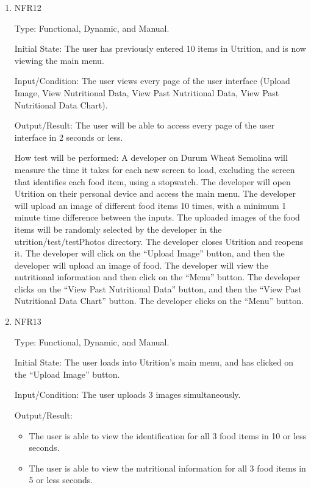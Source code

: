 \documentclass[12pt, titlepage]{article}
\begin{document}
\begin{enumerate}
	
\item{NFR12\\} 

Type: Functional, Dynamic, and Manual.

Initial State: The user has previously entered 10 items in Utrition, and is now viewing the main menu.

Input/Condition: The user views every page of the user interface (Upload Image, View Nutritional Data, View Past Nutritional Data, View Past Nutritional Data Chart).

Output/Result: The user will be able to access every page of the user interface in 2 seconds or less.

How test will be performed: A developer on Durum Wheat Semolina will measure the time it takes for each new screen to load, excluding the screen that identifies each food item, using a stopwatch. The developer will open Utrition on their personal device and access the main menu. The developer will upload an image of different food items 10 times, with a minimum 1 minute time difference between the inputs. The uploaded images of the food items will be randomly selected by the developer in the utrition/test/testPhotos directory. The developer closes Utrition and reopens it. The developer will click on the “Upload Image” button, and then the developer will upload an image of food. The developer will view the nutritional information and then click on the “Menu” button. The developer clicks on the “View Past Nutritional Data'' button, and then the “View Past Nutritional Data Chart” button. The developer clicks on the “Menu” button.

\item{NFR13\\} 

Type: Functional, Dynamic, and Manual.

Initial State: The user loads into Utrition’s main menu, and has clicked on the “Upload Image” button.

Input/Condition: The user uploads 3 images simultaneously.

Output/Result: 
\begin{itemize}
	\item The user is able to view the identification for all 3 food items in 10 or less seconds.
	\item The user is able to view the nutritional information for all 3 food items in 5 or less seconds.
\end{itemize}


\end{enumerate}
\end{document}
